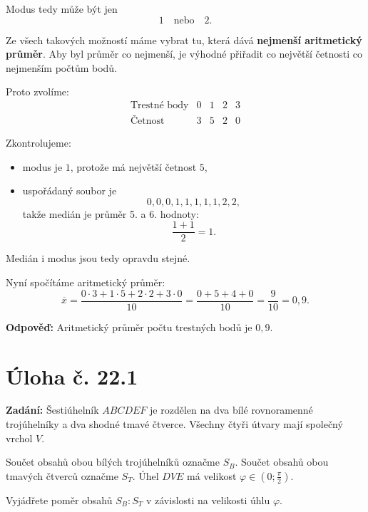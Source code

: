 \documentclass[12pt,a4paper]{article}
\begin{document}
Modus tedy může být jen
\[
1 \quad \text{nebo} \quad 2.
\]

\medskip

Ze všech takových možností máme vybrat tu, která dává \textbf{nejmenší aritmetický průměr}.  
Aby byl průměr co nejmenší, je výhodné přiřadit co největší četnosti co nejmenším počtům bodů.

Proto zvolíme:
\[
\begin{array}{c|cccc}
\text{Trestné body} & 0 & 1 & 2 & 3 \\
\hline
\text{Četnost} & 3 & 5 & 2 & 0
\end{array}
\]

Zkontrolujeme:
\begin{itemize}
    \item modus je \(1\), protože má největší četnost \(5\),
    \item uspořádaný soubor je
    \[
    0,0,0,1,1,1,1,1,2,2,
    \]
    takže medián je průměr 5. a 6. hodnoty:
    \[
    \frac{1+1}{2}=1.
    \]
\end{itemize}

Medián i modus jsou tedy opravdu stejné.

\medskip

Nyní spočítáme aritmetický průměr:
\[
\overline{x}=\frac{0\cdot 3+1\cdot 5+2\cdot 2+3\cdot 0}{10}
=\frac{0+5+4+0}{10}
=\frac{9}{10}=0{,}9.
\]

\bigskip

\textbf{Odpověď:}  
Aritmetický průměr počtu trestných bodů je \(0{,}9\).



\newpage
\section*{Úloha č. 22.1}

\textbf{Zadání:}  
Šestiúhelník \(ABCDEF\) je rozdělen na dva bílé rovnoramenné trojúhelníky a dva shodné tmavé čtverce. Všechny čtyři útvary mají společný vrchol \(V\).

Součet obsahů obou bílých trojúhelníků označme \(S_B\).  
Součet obsahů obou tmavých čtverců označme \(S_T\).  
Úhel \(DVE\) má velikost \(\varphi \in \left(0;\frac{\pi}{2}\right)\).

Vyjádřete poměr obsahů \(S_B : S_T\) v závislosti na velikosti úhlu \(\varphi\).

\bigskip
\end{document}
